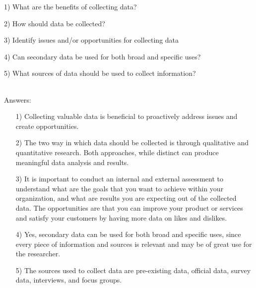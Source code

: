 \begin{testquestion}

\item[1)] What are the benefits of collecting data?
\item[2)]How should data be collected?
\item[3)]Identify issues and/or opportunities for collecting data
\item[4)]Can secondary data be used for both broad and specific uses?
\item[5)]What sources of data should be used to collect information? 
\end{testquestion}
\\
Answers:
	\begin{itemize}
\item[1)] Collecting valuable data is beneficial to proactively address issues and create opportunities.
\item[2)] The two way in which data should be collected is through qualitative and quantitative research. Both approaches, while distinct can produce meaningful data analysis and results.
\item[3)]It is important to conduct an internal and external assessment to understand what are the goals that you want to achieve within your organization, and what are results you are expecting out of the collected data. The opportunities are that you can improve your product or services and satisfy your customers by having more data on likes and dislikes.
\item[4)] Yes, secondary data can be used for both broad and specific uses, since every piece of information and sources is relevant and may be of great use for the researcher. 
\item[5)]The sources used to collect data are pre-existing data, official data, survey data, interviews, and focus groups. 
	\end{itemize}




